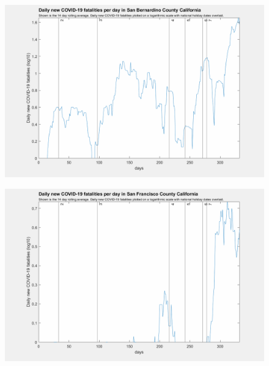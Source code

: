 \documentclass[]{article}
\begin{document}
\begin{figure}[!h]
	\includegraphics[width=\linewidth]{images/san_bernardino_fatalities_holiday_log.png}
	\caption{}
	\label{fig:images/san_bernardino_fatalities_holiday_logLabel}
\end{figure}

\begin{figure}[!h]
	\includegraphics[width=\linewidth]{images/san_francisco_fatalities_holiday_log.png}
	\caption{}
	\label{fig:images/san_francisco_fatalities_holiday_logLabel}
\end{figure}
\end{document}
